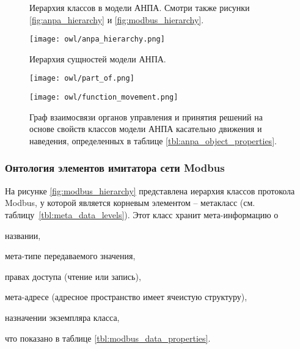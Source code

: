 \begin{center}
    \begin{figure}[hb!]
        \caption[Иерархия классов в модели АНПА.]
            {Иерархия классов в модели АНПА. Смотри также рисунки \ref{fig:anpa_hierarchy} и \ref{fig:modbus_hierarchy}.}\label{fig:common_classs_hierarchy}
        \texttt{[image: owl/anpa\_hierarchy.png]}
        \caption{Иерархия сущностей модели АНПА.}\label{fig:anpa_hierarchy}
        \texttt{[image: owl/part\_of.png]}
        \caption[Граф свойств объектов]
            {Граф свойств объектов модели АНПА <<являться частью>> и  <<питание>>,
                определенных в таблице \ref{tbl:anpa_object_properties}.}\label{fig:part_of}
        \texttt{[image: owl/function\_movement.png]}
        \caption[Граф взаимосвязи органов управления]%
            {Граф взаимосвязи органов управления и принятия решений на основе свойств классов модели АНПА касательно движения и наведения,
                определенных в таблице \ref{tbl:anpa_object_properties}.}\label{fig:function_movement}
    \end{figure}
\end{center}



\subsubsection{Онтология элементов имитатора сети Modbus}\label{sec:ontology_modbus}

На рисунке \ref{fig:modbus_hierarchy} представлена иерархия классов протокола Modbus,
у которой \mbelement является корневым элементом -- метакласс (см. таблицу~\ref{tbl:meta_data_levels}).
Этот класс хранит мета-информацию о
\begin{enumerate*}[label=\arabic*\upshape)]
    \item названии, 
    \item мета-типе передаваемого значения,
    \item правах доступа (чтение или запись),
    \item мета-адресе (адресное пространство имеет ячеистую структуру),
    \item назначении экземпляра класса,
\end{enumerate*}
что показано в таблице \ref{tbl:modbus_data_properties}.
%

